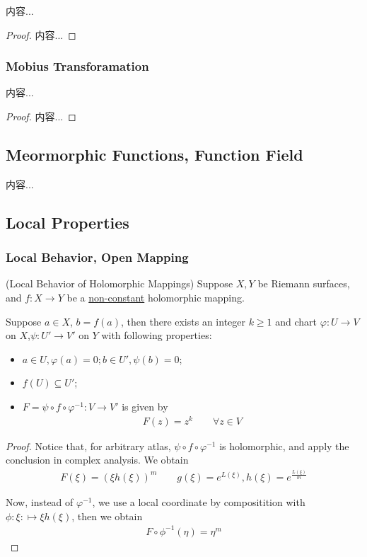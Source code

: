 \documentclass[Total.tex]{subfiles}
\begin{document}
			\begin{theorem}
				内容...
			\end{theorem}
			\begin{proof}
				内容...
			\end{proof}
			\subsubsection{Mobius Transforamation}	
			\begin{proposition}
				内容...
			\end{proposition}
			\begin{proof}
				内容...
			\end{proof}
			\subsection{Meormorphic Functions, Function Field}
			\begin{Def}
				内容...
			\end{Def}
			
			\subsection{Local Properties}
			\subsubsection{Local Behavior, Open Mapping}
			\begin{theorem}
				(Local Behavior of Holomorphic Mappings) Suppose $X,Y$ be Riemann surfaces, and $f:X\rightarrow Y$ be a \underline{non-constant} holomorphic mapping. 
				
				Suppose $a\in X$, $b=f(a)$, then there exists an integer $k\geq 1$ and chart $\varphi:U\rightarrow V$ on $X$,$\psi:U'\rightarrow V'$ on $Y$ with following properties:
				\begin{itemize}
					\item $a\in U,\varphi(a)=0; b\in U', \psi(b)=0$;
					\item $f(U)\subseteq U'$;
					\item $F=\psi\circ f\circ \varphi^{-1}:V\rightarrow V'$ is given by
					\begin{gather*}
						F(z)=z^k\qquad \forall z\in V
					\end{gather*}
				\end{itemize}
			\end{theorem}
			\begin{proof}
				Notice that, for arbitrary atlas,  $\psi\circ f\circ\varphi^{-1}$ is holomorphic, and apply the conclusion in complex analysis. We obtain
				\begin{gather*}
					F(\xi)=(\xi h(\xi))^m\qquad g(\xi)=e^{L(\xi)}, h(\xi)=e^{\frac{L(\xi)}{m}}
				\end{gather*}
				
				Now, instead of $\varphi^{-1}$, we use a local coordinate by compositition with $\phi:\xi:\mapsto \xi h(\xi)$, then we obtain 
				\begin{gather*}
					F\circ \phi^{-1}(\eta)=\eta^m
				\end{gather*}
			\end{proof}
			
\end{document}
